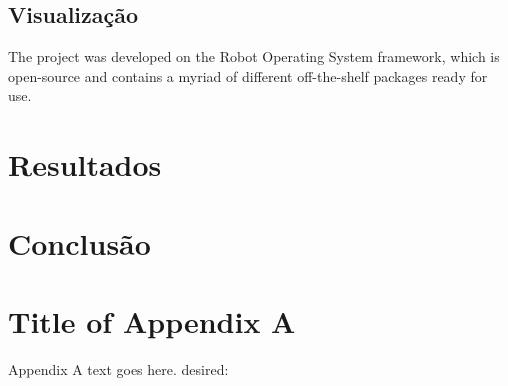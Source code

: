 \documentclass[journal]{IEEEtran}
\begin{document}
\subsection{Visualização}


The project was developed on the Robot Operating System framework, which is open-source and contains a myriad of different off-the-shelf packages ready for use.

\section{Resultados}

\section{Conclusão}


\appendices
\section{Title of Appendix A}
Appendix A text goes here.
desired:

\end{document}
